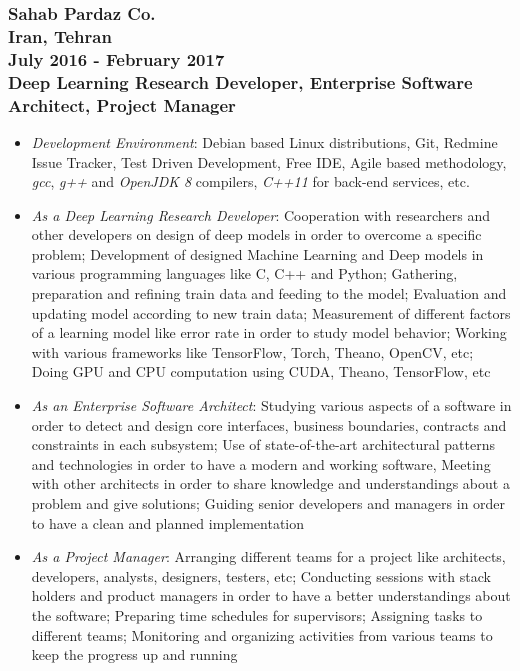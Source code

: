 \documentclass[10pt,a4paper]{article}
\begin{document}
\subsubsection{{\large Sahab Pardaz Co.} \\ \textnormal{Iran, Tehran} \\ \textnormal{July 2016 - February 2017} \\ {Deep Learning Research Developer, Enterprise Software Architect, Project Manager}}
  \setlength{\leftskip}{0.5cm}
  \setlength{\rightskip}{1cm}
  \begin{itemize}
    \setlength{\rightskip}{1cm}
    \setlength\itemsep{0em}
    \item \small \textit {Development Environment}: Debian based Linux distributions, Git, Redmine Issue Tracker, Test Driven Development, Free IDE, Agile based methodology, \textit {gcc}, \textit{g++} and \textit{OpenJDK 8} compilers, \textit{C++11} for back-end services, etc.
    \item \small \textit {As a Deep Learning Research Developer}: Cooperation with researchers and other developers on design of deep models in order to overcome a specific problem; Development of designed Machine Learning and Deep models in various programming languages like C, C++ and Python; Gathering, preparation and refining train data and feeding to the model; Evaluation and updating model according to new train data; Measurement of different factors of a learning model like error rate in order to study model behavior; Working with various frameworks like TensorFlow, Torch, Theano, OpenCV, etc; Doing GPU and CPU computation using CUDA, Theano, TensorFlow, etc
    \item \small \textit {As an Enterprise Software Architect}: Studying various aspects of a software in order to detect and design core interfaces, business boundaries, contracts and constraints in each subsystem; Use of state-of-the-art architectural patterns and technologies in order to have a modern and working software, Meeting with other architects in order to share knowledge and understandings about a problem and give solutions; Guiding senior developers and managers in order to have a clean and planned implementation
    \item \small \textit {As a Project Manager}: Arranging different teams for a project like architects, developers, analysts, designers, testers, etc; Conducting sessions with stack holders and product managers in order to have a better understandings about the software; Preparing time schedules for supervisors; Assigning tasks to different teams; Monitoring and organizing activities from various teams to keep the progress up and running
  \end{itemize}
  \setlength{\leftskip}{0pt}
  \setlength{\rightskip}{0cm}
  
\end{document}

